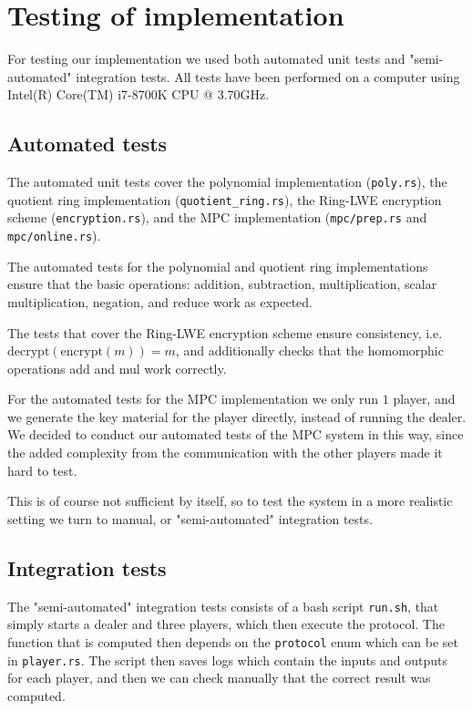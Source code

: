 \documentclass[../main.tex]{subfiles}
\begin{document}
\section{Testing of implementation}
For testing our implementation we used both automated unit tests and "semi-automated" integration tests.
All tests have been performed on a computer using Intel(R) Core(TM) i7-8700K CPU @ 3.70GHz.

\subsection{Automated tests}
The automated unit tests cover the polynomial implementation (\lstinline{poly.rs}), the quotient ring implementation (\lstinline{quotient_ring.rs}), the Ring-LWE encryption scheme (\lstinline{encryption.rs}), and the MPC implementation (\lstinline{mpc/prep.rs} and \lstinline{mpc/online.rs}).

The automated tests for the polynomial and quotient ring implementations ensure that the basic operations: addition, subtraction, multiplication, scalar multiplication, negation, and reduce work as expected.

The tests that cover the Ring-LWE encryption scheme ensure consistency, i.e. $\text{decrypt}(\text{encrypt}(m)) = m$, and additionally checks that the homomorphic operations add and mul work correctly.

For the automated tests for the MPC implementation we only run $1$ player, and we generate the key material for the player directly, instead of running the dealer. We decided to conduct our automated tests of the MPC system in this way, since the added complexity from the communication with the other players made it hard to test.

This is of course not sufficient by itself, so to test the system in a more realistic setting we turn to manual, or "semi-automated" integration tests.

\subsection{Integration tests}
The "semi-automated" integration tests consists of a bash script \lstinline{run.sh}, that simply starts a dealer and three players, which then execute the protocol. The function that is computed then depends on the \lstinline{protocol} enum which can be set in \lstinline{player.rs}. The script then saves logs which contain the inputs and outputs for each player, and then we can check manually that the correct result was computed.
\end{document}
